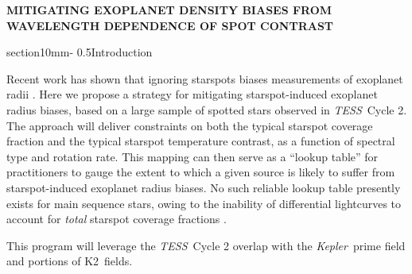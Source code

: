 \documentclass[letterpaper,11pt]{article}
\makeatletter
\renewcommand{\section}{\@startsection%
{section}{1}{0mm}{-\baselineskip}%
{0.5\baselineskip}{\normalfont\Large\bfseries}}%
\newcommand{\tess}{{\it TESS}}
\newcommand{\kepler}{{\it Kepler}}
\newcommand{\ktwo}{{K2}}
\makeatother
\begin{document}
\pagestyle{plain}
\setlength{\bibsep}{0.0pt}
\let\oldbibliography\thebibliography
\renewcommand{\thebibliography}[1]{%
  \oldbibliography{#1}%
  \setlength{\itemsep}{0pt}%
}




\begin{center}
\bfseries\uppercase{%
Mitigating exoplanet density biases from wavelength dependence of spot contrast
}
\end{center}




\section{Introduction}

Recent work has shown that ignoring starspots biases measurements of exoplanet radii \citep{2018ApJ...853..122R}.  Here we propose a strategy for mitigating starspot-induced exoplanet radius biases, based on a large sample of spotted stars observed in \tess\ Cycle 2.  The approach will deliver constraints on both the typical starspot coverage fraction and the typical starspot temperature contrast, as a function of spectral type and rotation rate.  This mapping can then serve as a ``lookup table'' for practitioners to gauge the extent to which a given source is likely to suffer from starspot-induced exoplanet radius biases.  No such reliable lookup table presently exists for main sequence stars, owing to the inability of differential lightcurves to account for \emph{total} starspot coverage fractions \citep{2018ApJ...865..142B}.

This program will leverage the \tess\ Cycle 2 overlap with the \kepler\ prime field and portions of \ktwo\ fields.
\end{document}

